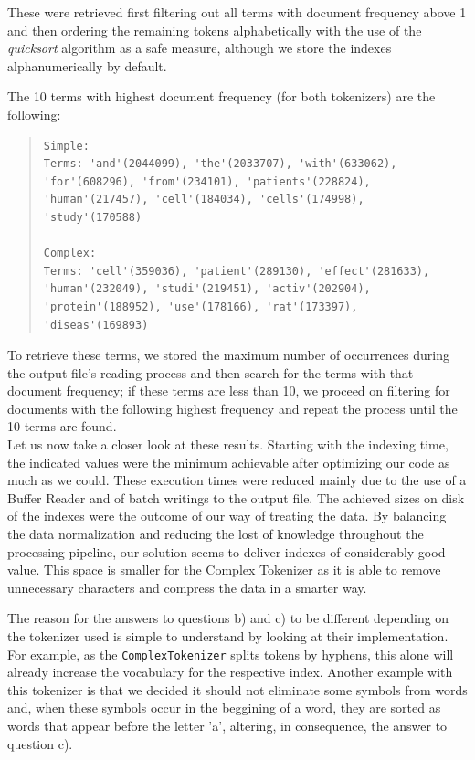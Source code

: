 \documentclass[12pt]{article}
\begin{document}
These were retrieved first filtering out all terms with document frequency
above 1 and then ordering the remaining tokens alphabetically with the use 
of the {\it quicksort\/} algorithm as a safe measure, although we store 
the indexes alphanumerically by default.

\newpage
The 10 terms with highest document frequency (for both tokenizers) are the 
following:

\begingroup
\addtolength\leftmargini{-0.4in}
\addtolength\baselineskip{-0.05in}
\begin{quote}
\begin{verbatim}
Simple:
Terms: 'and'(2044099), 'the'(2033707), 'with'(633062), 
'for'(608296), 'from'(234101), 'patients'(228824),
'human'(217457), 'cell'(184034), 'cells'(174998),
'study'(170588)

Complex:
Terms: 'cell'(359036), 'patient'(289130), 'effect'(281633),
'human'(232049), 'studi'(219451), 'activ'(202904),
'protein'(188952), 'use'(178166), 'rat'(173397),
'diseas'(169893)
\end{verbatim}
\end{quote}
\endgroup

To retrieve these terms, we stored the maximum number of occurrences
during the output file's reading process and then search for the terms
with that document frequency; if these terms are less than 10, we proceed 
on filtering for documents with the following highest frequency
and repeat the process until the 10 terms are found. \\

Let us now take a closer look at these results.
Starting with the indexing time, the indicated values were the minimum
achievable after optimizing our code as much as we could.
These execution times were reduced mainly due to the use of a Buffer Reader
and of batch writings to the output file.
The achieved sizes on disk of the indexes were the outcome of our way of 
treating the data. 
By balancing the data normalization and reducing the lost of 
knowledge throughout the processing pipeline, our solution seems to 
deliver indexes of considerably good value.
This space is smaller for the Complex Tokenizer as it is able to remove
unnecessary characters and compress the data in a smarter way.

The reason for the answers to questions b) and c) to be different depending on 
the tokenizer used is simple to understand by looking at their implementation.
For example, as the \texttt{ComplexTokenizer} splits tokens by hyphens, this
alone will already increase the vocabulary for the respective index.
Another example with this tokenizer is that we decided it should not eliminate
some symbols from words and, when these symbols occur in the beggining of a 
word, they are sorted as words that appear before the letter 'a', altering,
in consequence, the answer to question c).
\end{document}

